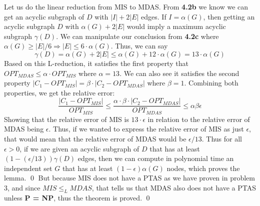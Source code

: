 \documentclass[oneside]{projectpaper} %
\begin{document}
Let us do the linear reduction from MIS to MDAS. From \textbf{4.2b} we know we can get an acyclic subgraph of $D$ with $|I| + 2|E|$ edges. If $I = \alpha(G)$, then getting an acyclic subgraph $D$ with $\alpha(G) + 2|E|$ would imply a maximum acyclic subgraph $\gamma(D)$. We can manipulate our conclusion from \textbf{4.2c} where $\alpha(G) \geq |E|/6 \Longrightarrow |E| \leq 6\cdot\alpha(G)$. Thus, we can say $$\gamma(D) = \alpha(G) + 2|E| \leq \alpha(G) + 12\cdot\alpha(G) = 13\cdot\alpha(G)$$ Based on this L-reduction, it satisfies the first property that $OPT_{MDAS} \leq \alpha \cdot OPT_{MIS}$ where $\alpha = 13$. We can also see it satisfies the second property $|C_1 - OPT_{MIS}| = \beta\cdot|C_2 - OPT_{MDAS}|$ where $\beta = 1$. Combining both properties, we get the relative error: $$\frac{|C_1 - OPT_{MIS}|}{OPT_{MIS}} \leq \frac{\alpha\cdot\beta\cdot|C_2 - OPT_{MDAS}|}{OPT_{MDAS}} \leq \alpha\beta\epsilon$$ Showing that the relative error of MIS is $13\cdot \epsilon$ in relation to the relative error of MDAS being $\epsilon$. Thus, if we wanted to express the relative error of MIS as just $\epsilon$, that would mean that the relative error of MDAS would be $\epsilon/13$. Thus for all $\epsilon > 0$, if we are given an acyclic subgraph of $D$ that has at least $(1-(\epsilon/13))\gamma(D)$ edges, then we can compute in polynomial time an independent set $G$ that has at least $(1-\epsilon)\alpha(G)$ nodes, which proves the lemma. \hfill\qed
\newline
\newline
But because MIS does not have a PTAS as we have proven in problem 3, and since $MIS \leq_L MDAS$, that tells us that MDAS also does not have a PTAS unless \textbf{P = NP}, thus the theorem is proved\cite{KoMa14}. \hfill\qed

\nocite{*}


\end{document}
